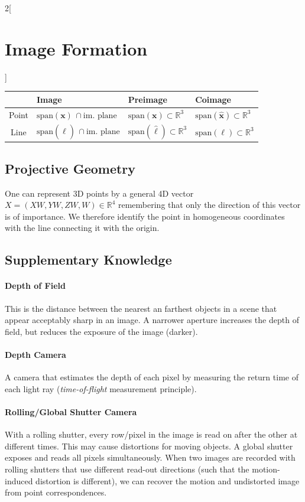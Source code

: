 \documentclass[oneside,fontsize=11pt,paper=a4]{scrartcl}
\begin{document}
\begin{multicols}{2}[\section{Image Formation}]
\vspace{1mm}
\renewcommand{\arraystretch}{1.3}%
\begin{tabularx}{\linewidth}{|c|Y|Y|Y|}
    \hline
     & Image & Preimage & Coimage \\ \hline
     Point & $\text{span}(\boldsymbol{x}) \, \cap \text{im. plane}$ & $\text{span}(\boldsymbol{x}) \subset \mathbb{R}^3$ & $\text{span}(\hat{\boldsymbol{x}}) \subset \mathbb{R}^3$ \\ \hline
     Line & $\text{span}(\hat{\boldsymbol{\ell}}) \, \cap \text{im. plane}$ & $\text{span}(\hat{\boldsymbol{\ell}}) \subset \mathbb{R}^3$ & $\text{span}(\boldsymbol{\ell}) \subset \mathbb{R}^3$ \\ \hline
\end{tabularx}
\renewcommand{\arraystretch}{1.0}%

\subsection{Projective Geometry}
One can represent 3D points by a general 4D vector $X = (XW, YW, ZW, W) \in \mathbb{R}^4$ remembering that only the direction of this vector is of importance.
We therefore identify the point in homogeneous coordinates with the line connecting it with the origin.

\subsection{Supplementary Knowledge}
\paragraph{Depth of Field} This is the distance between the nearest an farthest objects in a scene that appear acceptably sharp in an image. A narrower aperture increases the depth of field, but reduces the exposure of the image (darker).

\paragraph{Depth Camera} A camera that estimates the depth of each pixel by measuring the return time of each light ray (\textit{time-of-flight} measurement principle).

\paragraph{Rolling/Global Shutter Camera} With a rolling shutter, every row/pixel in the image is read on after the other at different times. This may cause distortions for moving objects. A global shutter exposes and reads all pixels simultaneously. When two images are recorded with rolling shutters that use different read-out directions (such that the motion-induced distortion is different), we can recover the motion and undistorted image from point correspondences.


\end{multicols}
\end{document}
